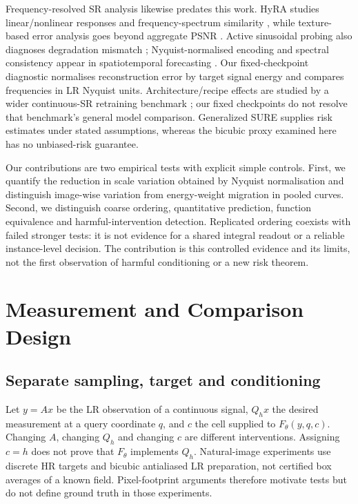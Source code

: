 Frequency-resolved SR analysis likewise predates this work. HyRA studies
linear/nonlinear responses and frequency-spectrum similarity
\cite{fsds2024}, while texture-based error analysis goes beyond aggregate
PSNR \cite{magid2022texture}. Active sinusoidal probing also diagnoses
degradation mismatch \cite{kawai2026frequency}; Nyquist-normalised encoding
and spectral consistency appear in spatiotemporal forecasting
\cite{wang2026scaleanchoring}. Our fixed-checkpoint diagnostic normalises
reconstruction error by target signal energy and compares frequencies
in LR Nyquist units. Architecture/recipe effects are studied by a wider
continuous-SR retraining benchmark \cite{nasir2026empirical}; our fixed
checkpoints do not resolve that benchmark's general model comparison.
Generalized SURE \cite{eldar2008gsure} supplies risk estimates under stated
assumptions, whereas the bicubic proxy examined here has no unbiased-risk
guarantee.

Our contributions are two empirical tests with explicit simple controls.
First, we quantify the reduction in scale variation obtained by Nyquist
normalisation and distinguish image-wise variation from energy-weight
migration in pooled curves. Second, we distinguish coarse ordering, quantitative
prediction, function equivalence and harmful-intervention detection.
Replicated ordering coexists with failed stronger tests: it is not
evidence for a shared integral readout or a reliable instance-level
decision. The contribution is this controlled evidence and its limits,
not the first observation of harmful conditioning or a new risk theorem.

\section{Measurement and Comparison Design}
\label{sec:method}
\subsection{Separate sampling, target and conditioning}
Let $y=Ax$ be the LR observation of a continuous signal, $Q_hx$ the desired
measurement at a query coordinate $q$, and $c$ the cell supplied to
$F_\theta(y,q,c)$. Changing $A$, changing $Q_h$ and changing $c$ are
different interventions. Assigning $c=h$ does not prove that $F_\theta$
implements $Q_h$. Natural-image experiments use discrete HR targets and
bicubic antialiased LR preparation, not certified box averages of a known
field. Pixel-footprint arguments therefore motivate tests but do not
define ground truth in those experiments.

